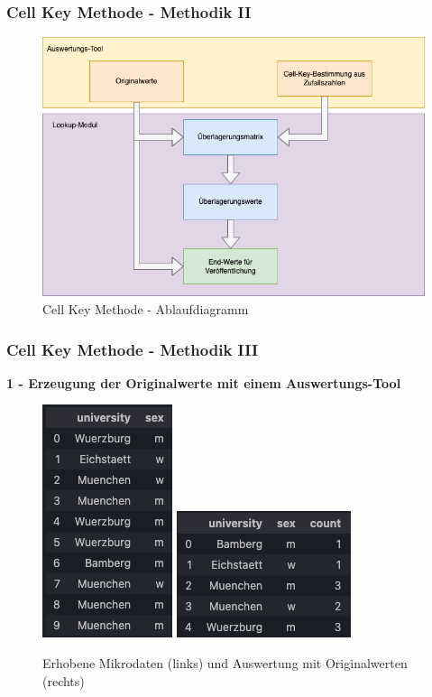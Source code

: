 \documentclass[aspectratio=169]{beamer}
\begin{document}
\begin{frame}{}
	\frametitle{Cell Key Methode - Methodik II}
    \begin{figure}
		\centering
		\includegraphics[width=0.59\linewidth]{img/ckm_flow.png}
		\caption{Cell Key Methode - Ablaufdiagramm}
		\label{fig:ckm_flow}
	\end{figure} 
\end{frame}


\begin{frame}{}
	\frametitle{Cell Key Methode - Methodik III}
    \textbf{1 - Erzeugung der Originalwerte mit einem Auswertungs-Tool} 
    \begin{figure}
		\centering
		\includegraphics[width=0.2\linewidth]{img/ckm_1.png}
        \includegraphics[width=0.25\linewidth]{img/ckm_2.png}
        \caption{Erhobene Mikrodaten (links) und Auswertung mit Originalwerten (rechts)}
	\end{figure} 
\end{frame}
\end{document}
